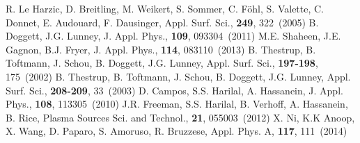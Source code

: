 \documentclass[aip, jap, reprint, amsmath, amssymb]{revtex4-1}
\begin{document}
\begin{thebibliography}{99}
 R. Le Harzic, D. Breitling, M. Weikert, S. Sommer, C. F{\"o}hl, S. Valette, C. Donnet, E. Audouard, F. Dausinger, Appl. Surf. Sci., {\bf249}, 322~(2005)
 B. Doggett, J.G. Lunney, J. Appl. Phys., {\bf109}, 093304~(2011)
 M.E. Shaheen, J.E. Gagnon, B.J. Fryer, J. Appl. Phys., {\bf114}, 083110~(2013)
 B. Thestrup, B. Toftmann, J. Schou, B. Doggett, J.G. Lunney, Appl. Surf. Sci., {\bf197-198}, 175~(2002)
 B. Thestrup, B. Toftmann, J. Schou, B. Doggett, J.G. Lunney, Appl. Surf. Sci., {\bf208-209}, 33~(2003)
 D. Campos, S.S. Harilal, A. Hassanein, J. Appl. Phys., {\bf108}, 113305~(2010)
 J.R. Freeman, S.S. Harilal, B. Verhoff, A. Hassanein, B. Rice, Plasma Sources Sci. and Technol., {\bf21}, 055003~(2012)
 X. Ni, K.K Anoop, X. Wang, D. Paparo, S. Amoruso, R. Bruzzese, Appl. Phys. A, {\bf117}, 111~(2014)
\end{thebibliography}
\end{document}
